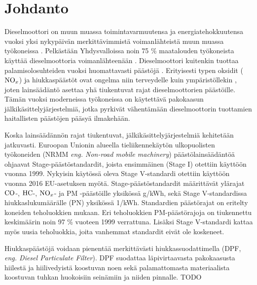 \chapter{Johdanto}%
\label{ch:johdanto}
Dieselmoottori on muun muassa toimintavarmuutensa ja energiatehokkuutensa vuoksi yksi nykypäivän merkittävimmistä voimanlähteistä muun muassa työkoneissa \cite[s. 121, 137-138]{Koten_2024}.
Pelkästään Yhdysvalloissa noin 75 \% maatalouden työkoneista käyttää dieselmoottoria voimanlähteenään \cite[s. 122]{Koten_2024}.  
Dieselmoottori kuitenkin tuottaa palamisolosuhteiden vuoksi
huomattavasti päästöjä \cite{FiebigMichael2014Pefd}. Erityisesti typen oksidit (\(\ce{NO}_x\)) ja hiukkaspäästöt ovat ongelma niin terveydelle kuin ympäristöllekin \cite[s. 138]{Koten_2024}\cite{YaoDongwei2023Rodm}, joten  lainsäädäntö asettaa yhä tiukentuvat rajat dieselmoottorien päästöille. Tämän vuoksi moderneissa työkoneissa on käytettävä pakokaasun jälkikäsittelyjärjestelmiä, jotka pyrkivät vähentämään dieselmoottorin tuottamien haitallisten päästöjen pääsyä ilmakehään.

Koska lainsäädännön rajat tiukentuvat, jälkikäsittelyjärjestelmiä kehitetään jatkuvasti. Euroopan Unionin alueella tieliikennekäytön ulkopuolisten työkoneiden (NRMM \emph{eng. Non-road mobile machinery}) päästölainsäädäntöä ohjaavat Stage-päästöstandardit, joista ensimmäinen (Stage I) otettiin käyttöön vuonna 1999. Nykyisin käytössä oleva Stage V-standardi  otettiin käyttöön vuonna 2016 EU-asetuksen myötä. Stage-päästöstandardit määrittävät ylärajat \(\ce{CO}\)-, \(\ce{HC}\)-, \(\ce{NO}_x\)- ja PM -päästöille yksikössä g/kWh, sekä Stage V-standardissa hiukkaslukumäärälle (PN) yksikössä 1/kWh.
Standardien päästörajat on eritelty koneiden teholuokkien mukaan. Eri teholuokkien PM-päästörajoja on tiukennettu keskimäärin noin 97 \% vuoteen 1999 verrattuna. Lisäksi Stage V-standardi kattaa myös uusia teholuokkia, joita vanhemmat standardit eivät ole koskeneet.  \cite{eu_asetus_stage_v}\cite{dieselnet_eu_legislation}  

Hiukkaspäästöjä voidaan pienentää merkittävästi hiukkassuodattimella (DPF, \emph{eng. Diesel Particulate Filter}).
DPF suodattaa läpivirtaavasta pakokaasusta hiilestä ja hiilivedyistä koostuvan noen sekä palamattomasta materiaalista koostuvan tuhkan huokoisiin seinämiin ja niiden pinnalle. {\color{red} TODO}

